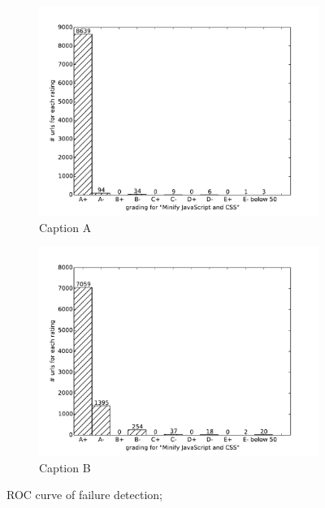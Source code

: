 \documentclass[a4paper,10pt]{IEEEtran}
\begin{document}
\begin{figure}
    \centering
    \begin{subfigure}[b]{\columnwidth}        %
        \centering
        \includegraphics[width=\linewidth]{img/virtual-labs/container/Minify JavaScript and CSS.pdf}
        \caption{Caption A}
        \label{fig:A}
    \end{subfigure}
    \hfill
    \begin{subfigure}[b]{\columnwidth}        %
        \centering
        \includegraphics[width=\linewidth]{img/virtual-labs/deploy/Minify JavaScript and CSS.pdf}
        \caption{Caption B}
        \label{fig:B}
    \end{subfigure}
    \caption{ROC curve of failure detection;}
    \label{fig:roc_curve}
\end{figure}
\end{document}
